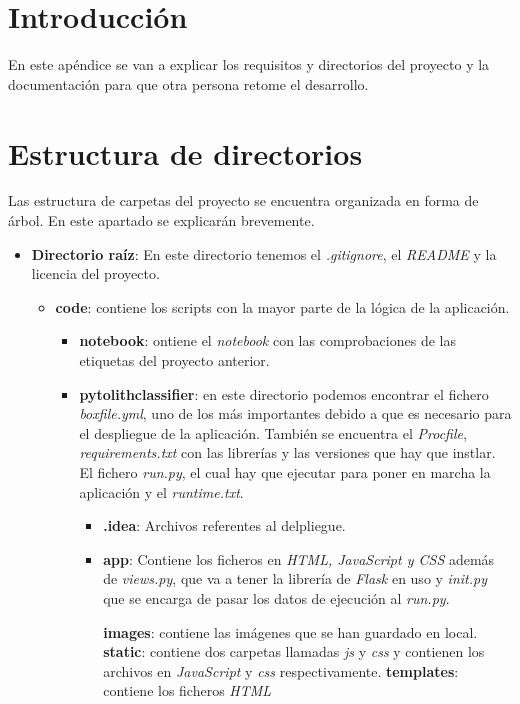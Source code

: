 
\section{Introducción}
En este apéndice se van a explicar los requisitos y directorios del proyecto y la documentación para que otra persona retome el desarrollo.
\section{Estructura de directorios}
Las estructura de carpetas del proyecto se encuentra organizada en forma de árbol. En este apartado se explicarán brevemente.

\begin{itemize}
	\item \textbf{Directorio raíz}: En este directorio tenemos el \textit{.gitignore}, el \textit{README} y la licencia del proyecto.
	\begin{itemize}
		\item \textbf{code}: contiene los scripts con la mayor parte de la lógica de la aplicación.
			\begin{itemize}
				\item \textbf{notebook}: ontiene el \textit{notebook} con las comprobaciones de las etiquetas del proyecto anterior.
				\item \textbf{pytolithclassifier}: en este directorio podemos encontrar el fichero \textit{boxfile.yml}, uno de los más importantes debido a que es necesario para el despliegue de la aplicación. También se encuentra el \textit{Procfile}, \textit{requirements.txt} con las librerías y las versiones que hay que instlar. El fichero \textit{run.py}, el cual hay que ejecutar para poner en marcha la aplicación y el \textit{runtime.txt}.
				\begin{itemize}
					\item \textbf{.idea}: Archivos referentes al delpliegue.
					\item \textbf{app}: Contiene los ficheros en \textit{HTML, JavaScript y CSS} además de \textit{views.py}, que va a tener la librería de \textit{Flask} en uso y \textit{init.py} que se encarga de pasar los datos de ejecución al \textit{run.py}.
					
						\subitem \textbf{images}: contiene las imágenes que se han guardado en local.
						\subitem \textbf{static}: contiene dos carpetas llamadas \textit{js} y \textit{ css} y contienen los archivos en \textit{JavaScript} y \textit{css} respectivamente.
						\subitem \textbf{templates}: contiene los ficheros \textit{HTML} 
					

\end{itemize}
\end{itemize}
\end{itemize}
\end{itemize}
